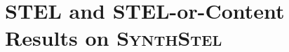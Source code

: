 \newpage
\section{STEL and STEL-or-Content Results on \textsc{SynthStel}}
\label{sec:appendix:fullsynthstelresults}

\fullsynthstelevaltable